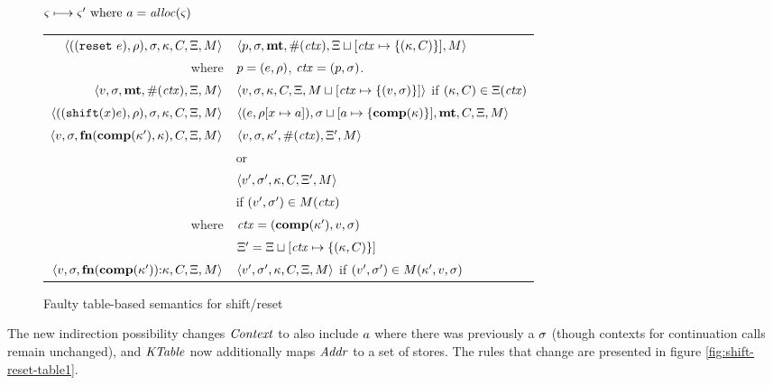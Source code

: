 \begin{figure*}
  \centering
  $\varsigma \longmapsto \varsigma' \text{ where } a = \mathit{alloc}(\varsigma)$ \\
  \begin{tabular}{r|l}
    \hline
    $\langle ((\texttt{reset}\ e), \rho), \sigma, \kappa, C, \Xi, M \rangle$
    &
    $\langle p, \sigma, \mathbf{mt}, \#(\mathit{ctx}), \Xi\sqcup[\mathit{ctx} \mapsto \{ (\kappa,C) \}], M \rangle$
    \\
    where & $p = (e, \rho)$, $\mathit{ctx} = (p, \sigma)$.
    \\
    $\langle v, \sigma, \mathbf{mt}, \#(\mathit{ctx}), \Xi, M \rangle$
    &
    $\langle v, \sigma, {\kappa}, {C}, \Xi, M\sqcup[\mathit{ctx} \mapsto \{ (v,\sigma) \}] \rangle$
    if $(\kappa,C) \in \Xi(\mathit{ctx})$
    \\
    $\langle ((\texttt{shift} (x) e), \rho), \sigma, \kappa, C, \Xi, M \rangle$
    &
    $\langle (e, \rho[x \mapsto a]), \sigma\sqcup[a \mapsto \{ \mathbf{comp}(\kappa) \}],\mathbf{mt},C,\Xi,M \rangle$
    \\
    $\langle v,\sigma,\mathbf{fn}{}(\mathbf{comp}(\kappa'), \kappa), C, \Xi, M \rangle$
    &
    $\langle v, \sigma, \kappa', \#(\mathit{ctx}), \Xi',M \rangle$
    \\
    & or \\
    & $\langle v', \sigma', \kappa, C, \Xi',M \rangle$
    \\ & \quad if $(v',\sigma') \in M(\mathit{ctx})$
    \\
    where & $\mathit{ctx} = (\mathbf{comp}(\kappa'), v, \sigma)$ \\
          & $\Xi' = \Xi\sqcup[\mathit{ctx} \mapsto \{ (\kappa,C) \}]$
    \\
    $\langle v,\sigma,\mathbf{fn}{}(\mathbf{comp}(\kappa')){\tt :} \kappa, C, \Xi, M \rangle$
    &
    $\langle v', \sigma', \kappa, C, \Xi,M \rangle$ if $(v',\sigma') \in M(\kappa',v,\sigma)$
  \end{tabular}  
  \caption{Faulty table-based semantics for shift/reset}
  \label{fig:shift-reset-table0}
\end{figure*}

The new indirection possibility changes $\mathit{Context}$ to also include $a$ where there was previously a $\sigma$ (though contexts for continuation calls remain unchanged), and $\mathit{KTable}$ now additionally maps $\mathit{Addr}$ to a set of stores.
%
The rules that change are presented in figure \ref{fig:shift-reset-table1}.


